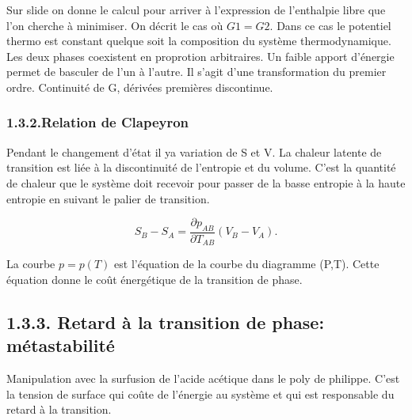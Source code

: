 \documentclass[french, a4paper, 10pt, twocolumn, landscape]{article}
\begin{document}
Sur slide on donne le calcul pour arriver à l'expression de l'enthalpie libre que l'on cherche à minimiser. On décrit le cas où $G1=G2$. Dans ce cas le potentiel thermo est constant quelque soit la composition du système thermodynamique. Les deux phases coexistent en proprotion arbitraires. Un faible apport d'énergie permet de basculer de l'un à l'autre.  Il s'agit d'une transformation du premier ordre. Continuité de G, dérivées premières discontinue. 

\subsubsection*{1.3.2.Relation de Clapeyron}

Pendant le changement d'état il ya variation de S et V. La chaleur latente de transition est liée à la discontinuité de l'entropie et du volume. C'est la quantité de chaleur que le système doit recevoir pour passer de la basse entropie à la haute entropie en suivant le palier de transition. 

\begin{equation}
  S_B-S_A=\dfrac{\partial p_{AB}}{\partial T_{AB}}(V_B-V_A).
\end{equation}

La courbe $p=p(T)$ est l'équation de la  courbe du diagramme (P,T). Cette équation donne le coût énergétique  de la transition de phase. 

\subsection*{1.3.3. Retard à la transition de phase: métastabilité}

Manipulation avec la surfusion de l'acide acétique dans le poly de philippe. C'est la tension de surface qui coûte de l'énergie au système et qui est responsable du retard à la transition.





\end{document}

